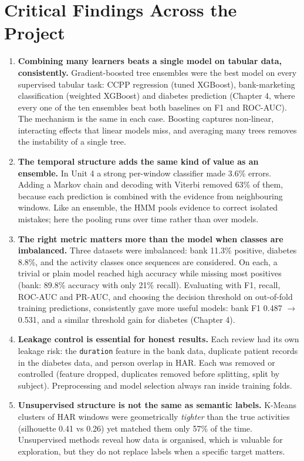 \section{Critical Findings Across the Project}
\begin{enumerate}
\item \textbf{Combining many learners beats a single model on tabular data, consistently.} Gradient-boosted tree
ensembles were the best model on every supervised tabular task: CCPP regression (tuned XGBoost), bank-marketing
classification (weighted XGBoost) and diabetes prediction (Chapter 4, where every one of the ten ensembles beat both
baselines on F1 and ROC-AUC). The mechanism is the same in each case. Boosting captures non-linear, interacting effects
that linear models miss, and averaging many trees removes the instability of a single tree.

\item \textbf{The temporal structure adds the same kind of value as an ensemble.} In Unit 4 a strong per-window
classifier made 3.6\% errors. Adding a Markov chain and decoding with Viterbi removed 63\% of them, because each
prediction is combined with the evidence from neighbouring windows. Like an ensemble, the HMM pools evidence to correct
isolated mistakes; here the pooling runs over time rather than over models.

\item \textbf{The right metric matters more than the model when classes are imbalanced.} Three datasets were
imbalanced: bank 11.3\% positive, diabetes 8.8\%, and the activity classes once sequences are considered. On each, a
trivial or plain model reached high accuracy while missing most positives (bank: 89.8\% accuracy with only 21\% recall).
Evaluating with F1, recall, ROC-AUC and PR-AUC, and choosing the decision threshold on out-of-fold training predictions,
consistently gave more useful models: bank F1 0.487 $\rightarrow$ 0.531, and a similar threshold gain for diabetes
(Chapter 4).

\item \textbf{Leakage control is essential for honest results.} Each review had its own leakage risk: the
\texttt{duration} feature in the bank data, duplicate patient records in the diabetes data, and person overlap in HAR.
Each was removed or controlled (feature dropped, duplicates removed before splitting, split by subject). Preprocessing
and model selection always ran inside training folds.

\item \textbf{Unsupervised structure is not the same as semantic labels.} K-Means clusters of HAR windows were
geometrically \emph{tighter} than the true activities (silhouette 0.41 vs 0.26) yet matched them only 57\% of the time.
Unsupervised methods reveal how data is organised, which is valuable for exploration, but they do not replace labels
when a specific target matters.


\end{enumerate}
